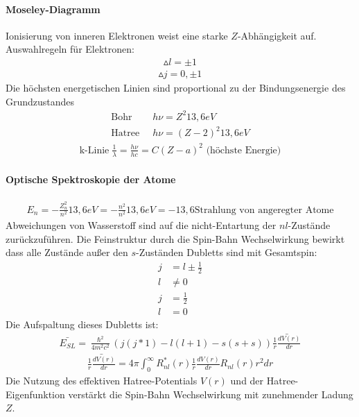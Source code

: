 \documentclass[10pt,a4paper]{article}
\begin{document}
\paragraph{Moseley-Diagramm}
Ionisierung von inneren Elektronen weist eine starke $Z$-Abhängigkeit auf.\\
Auswahlregeln für Elektronen:
\begin{align}
\vartriangle l= \pm 1
\end{align}
\begin{align}
\vartriangle j= 0, \pm 1
\end{align}
Die höchsten energetischen Linien sind proportional zu der Bindungsenergie des Grundzustandes
\begin{align}
\text{Bohr}\;\; &h \nu= Z^2 13,6 eV\\
\text{Hatree}\;\; &h \nu= (Z-2)^2 13,6 eV
\end{align}
\begin{align}
\text{k-Linie}\; \frac{1}{\lambda}=\frac{h \nu}{hc}= C(Z-a)^2 \text{ (höchste Energie)}
\end{align}
\paragraph{Optische Spektroskopie der Atome}
\begin{align}
E_n=-\frac{Z_n^2}{n^2} 13,6 eV= -\frac{n^2}{n^2} 13,6 eV = -13,6 \text{Strahlung von angeregter Atome}
\end{align}
Abweichungen von Wasserstoff sind auf die nicht-Entartung der $nl$-Zustände zurückzuführen. Die Feinstruktur durch die Spin-Bahn Wechselwirkung bewirkt dass alle Zustände außer den $s$-Zuständen Dubletts sind mit Gesamtspin:
\begin{align}
j&=l \pm \frac{1}{2} \\
l &\neq 0\\
j&= \frac{1}{2} \\
l&=0
\end{align}
Die Aufspaltung dieses Dubletts ist:
\begin{align}
\bar{E_{SL}}=\frac{\hslash^2}{4 m^2 c^2} (j(j*1)-l(l+1)-s(s+s)) \bar{\frac{1}{r}\frac{dV(r)}{dr}}
\end{align}
\begin{align}
\bar{\frac{1}{r}\frac{dV(r)}{dr}}= 4 \pi \int_0^{\infty} R_{nl}^*(r) \frac{1}{r} \frac{dV(r)}{dr} R_{nl}(r) r^2 dr
\end{align}
Die Nutzung des effektiven Hatree-Potentials $V(r) $ und der Hatree-Eigenfunktion verstärkt die Spin-Bahn Wechselwirkung mit zunehmender Ladung $Z$.
\end{document}
